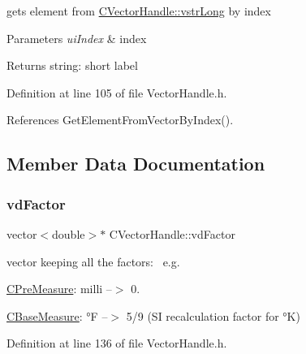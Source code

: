 gets element from \hyperlink{classCVectorHandle_a71bec0e385b9ca8e5ffa174b559da9f8}{C\+Vector\+Handle\+::vstr\+Long} by index 


\begin{DoxyParams}{Parameters}
{\em ui\+Index} & index \\
\hline
\end{DoxyParams}
\begin{DoxyReturn}{Returns}
string\+: short label 
\end{DoxyReturn}


Definition at line 105 of file Vector\+Handle.\+h.



References Get\+Element\+From\+Vector\+By\+Index().



\subsection{Member Data Documentation}
\mbox{\label{classCVectorHandle_af8f8b2e0da8363e695872ca85f33364e}} 
\subsubsection{\texorpdfstring{vd\+Factor}{vdFactor}}
{\footnotesize\ttfamily vector$<$double$>$$\ast$ C\+Vector\+Handle\+::vd\+Factor\hspace{0.3cm}{\ttfamily [protected]}}



vector keeping all the factors\+:~\newline
 e.\+g. 


\begin{DoxyItemize}
\item \hyperlink{classCPreMeasure}{C\+Pre\+Measure}\+: milli --$>$ 0.
\item \hyperlink{classCBaseMeasure}{C\+Base\+Measure}\+: °F --$>$ 5/9 (SI recalculation factor for °K) 
\end{DoxyItemize}

Definition at line 136 of file Vector\+Handle.\+h.

\mbox{\label{classCVectorHandle_a71bec0e385b9ca8e5ffa174b559da9f8}} 
